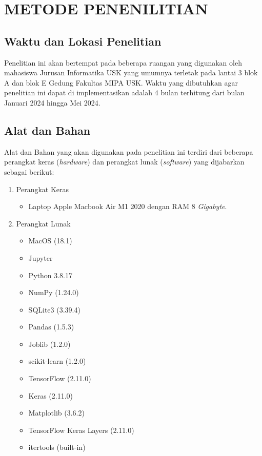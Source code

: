 \chapter{METODE PENENILITIAN}
\section{Waktu dan Lokasi Penelitian}
Penelitian ini akan bertempat pada beberapa ruangan yang digunakan oleh mahasiswa Jurusan Informatika USK yang umumnya terletak pada lantai 3 blok A dan blok E Gedung Fakultas MIPA USK. Waktu yang dibutuhkan agar penelitian ini dapat di implementasikan adalah 4 bulan terhitung dari bulan Januari 2024 hingga Mei 2024.

\section{Alat dan Bahan}
Alat dan Bahan yang akan digunakan pada penelitian ini terdiri dari beberapa perangkat keras (\textit{hardware}) dan perangkat lunak (\textit{software}) yang dijabarkan sebagai berikut:

\begin{enumerate}
\item Perangkat Keras
	\begin{itemize}
	\item Laptop Apple Macbook Air M1 2020 dengan RAM 8 \textit{Gigabyte}.
    \end{itemize}
\item Perangkat Lunak
	\begin{itemize}
	\item MacOS (18.1)
	\item Jupyter 
	\item Python 3.8.17
    \item NumPy (1.24.0)
    \item SQLite3 (3.39.4)
    \item Pandas (1.5.3)
    \item Joblib (1.2.0)
    \item scikit-learn (1.2.0)
    \item TensorFlow (2.11.0)
    \item Keras (2.11.0)
    \item Matplotlib (3.6.2)
    \item TensorFlow Keras Layers (2.11.0)
    \item itertools (built-in)
	\end{itemize}
\end{enumerate}
\newpage
